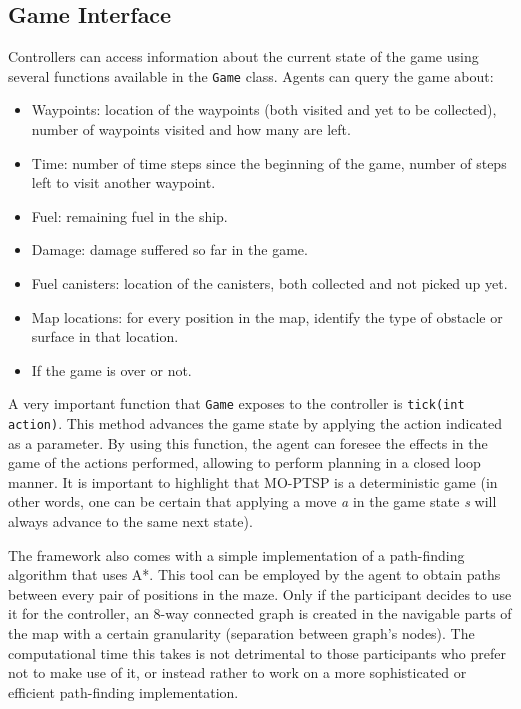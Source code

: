 \documentclass[conference]{IEEEtran}
\newcommand{\code}[1]{{\lstinline!#1!}}
\begin{document}

\subsection{Game Interface} \label{ssec:cont}

Controllers can access information about the current state of the game using several functions available in the \code{Game} class. Agents can query the game about:

\begin{itemize}
\item Waypoints: location of the waypoints (both visited and yet to be collected), number of waypoints visited and how many are left.
\item Time: number of time steps since the beginning of the game, number of steps left to visit another waypoint.
\item Fuel: remaining fuel in the ship.
\item Damage: damage suffered so far in the game.
\item Fuel canisters: location of the canisters, both collected and not picked up yet.
\item Map locations: for every position in the map, identify the type of obstacle or surface in that location.
\item If the game is over or not.
\end{itemize}

A very important function that \code{Game} exposes to the controller is \code{tick(int action)}. This method advances the game state by applying the action indicated as a parameter. By using this function, the agent can foresee the effects in the game of the actions performed, allowing to perform planning in a closed loop manner. It is important to highlight that MO-PTSP is a deterministic game (in other words, one can be certain that applying a move \textit{a} in the game state \textit{s} will always advance to the same next state).

The framework also comes with a simple implementation of a path-finding algorithm that uses A*. This tool can be employed by the agent to obtain paths between every pair of positions in the maze. Only if the participant decides to use it for the controller, an 8-way connected graph is created in the navigable parts of the map with a certain granularity (separation between graph's nodes). The computational time this takes is not detrimental to those participants who prefer not to make use of it, or instead rather to work on a more sophisticated or efficient path-finding implementation.
\end{document}
